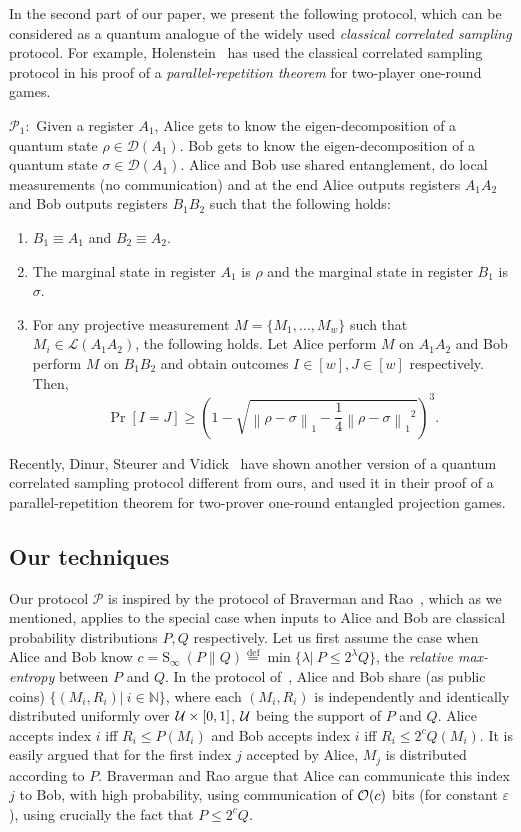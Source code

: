 \documentclass[11pt,a4paper]{article}
\def\U{\CMcal{U}}
\def\O{\CMcal{O}}
\theoremstyle{plain}
\theoremstyle{definition}
\newcommand {\br} [1] {\ensuremath{ \left( #1 \right) }}
\newcommand {\minusspace} {\: \! \!}
\newcommand {\fn} [2] {\ensuremath{ #1 \minusspace \br{ #2 } }}
\newcommand {\defeq} {\ensuremath{ \stackrel{\mathrm{def}}{=} }}
\newcommand {\norm} [1] {\ensuremath{ \left\| #1 \right\| }}
\newcommand {\normsub} [2] {\ensuremath{ \norm{#1}_{#2} }}
\newcommand {\onenorm} [1] {\normsub{#1}{1}}
\newcommand {\rminent} [2] {\fn{\mathrm{S}_{\infty}}{#1 \middle\| #2}}
\newcommand {\Prot}{\mathcal{P}}
\def\ve{{\varepsilon}}
\begin{document}
\bigskip 

In the second part of our paper, we present the following protocol, which can be considered as a quantum analogue of the widely used {\em classical correlated sampling} protocol. For example, Holenstein~\cite{Holenstein2007} has used the classical correlated sampling protocol in his proof of a {\em parallel-repetition theorem} for two-player one-round games.

\bigskip 

\noindent $\Prot_1:$ Given a register $A_1$, Alice gets to know the eigen-decomposition of a quantum state $\rho\in \mathcal{D}(A_1)$. Bob gets to know the eigen-decomposition of a quantum state $\sigma \in \mathcal{D}(A_1)$. Alice and Bob use shared entanglement, do local measurements (no communication) and at the end Alice outputs registers $A_1A_2$ and Bob outputs registers $B_1B_2$ such that the following holds:
\begin{enumerate}
\item $B_1\equiv A_1$ and $B_2\equiv A_2$.
\item The marginal state in register $A_1$ is $\rho$ and the marginal state in register $B_1$  is $\sigma$.
\item For any projective measurement $M  = \{M_1, \ldots , M_w\}$ such that $M_i \in \mathcal{L}(A_1A_2)$, the following holds. Let Alice perform $M$ on $A_1A_2$ and Bob perform $M$ on $B_1B_2$  and obtain outcomes $I \in [w], J \in [w]$ respectively. Then,
$$ \Pr[I = J]  \geq  \left(1-\sqrt{\onenorm{\rho-\sigma} - \frac{1}{4}\onenorm{\rho-\sigma}^2}\right)^{3} . $$
\end{enumerate}

Recently, Dinur, Steurer and Vidick~\cite{DinurSteurerVidick:2013} have shown another version of a  quantum correlated sampling protocol different from ours, and used it in their proof of a parallel-repetition theorem for two-prover one-round entangled projection games.


\subsection*{Our techniques}

Our protocol $\Prot$ is inspired by the protocol of Braverman and Rao~\cite{Braverman2011}, which as we mentioned, applies to the special case when inputs to Alice and Bob are classical probability distributions $P,Q$ respectively. Let us first assume the case when Alice and Bob know $c = \rminent{P}{Q} \defeq \min\{\lambda |~ P \leq 2^\lambda Q \}$, the {\em relative max-entropy} between $P$ and $Q$. In the protocol of~\cite{Braverman2011}, Alice and Bob share (as public coins) $\{(M_i,R_i)|~ i \in \mathbb{N}\}$, where each $(M_i,R_i)$ is independently and identically distributed uniformly over $\U\times[0,1]$, $\U$ being the support of $P$ and $Q$. Alice accepts index $i$ iff $ R_i \leq P(M_i) $ and Bob accepts index $i$ iff $ R_i \leq  2^c Q(M_i) $. It is easily argued that for the first index $j$ accepted by Alice, $M_j$ is distributed according to $P$. Braverman and Rao argue that Alice can communicate this index $j$ to Bob, with high probability, using communication of $\O(c)$ bits (for constant $\ve$), using crucially the fact that $P \leq 2^c Q $.  
\end{document}

